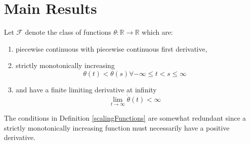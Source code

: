 \documentclass{mc}
\begin{document}
\section{Main Results}

\begin{definition}
  \label{scalingFunctions}Let $\mathcal{F}$ denote the class of functions
  $\theta : \mathbb{R} \to \mathbb{R}$ which are:
  \begin{enumerate}
    \item piecewise continuous with piecewise continuous first derivative,
    
    \item strictly monotonically increasing
    \begin{equation}
      \theta (t) < \theta (s) \forall - \infty \leqslant t < s \leqslant
      \infty
    \end{equation}
    \item and have a finite limiting derivative at infinity
    \begin{equation}
      \lim_{t \to \infty}  \dot{\theta} (t) < \infty
    \end{equation}
  \end{enumerate}
\end{definition}

\begin{remark}
  The conditions in Definition \ref{scalingFunctions} are somewhat redundant
  since a strictly monotonically increasing function must necessarily have a
  positive derivative.
\end{remark}

\
\end{document}
